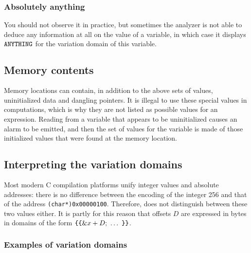 \documentclass{frama-c-book}
\newcommand{\cbopen}{\mbox{\tt \{}}
\newcommand{\cbclose}{\mbox{\tt \}}}
\begin{document}
\subsubsection{Absolutely anything}
You should not observe it in practice, but sometimes the analyzer is
not able to deduce any information at all on the value of a variable,
in which case it displays $\mbox{\tt ANYTHING}$ for the variation
domain of this variable.

\subsection{Memory contents}

Memory locations can contain, in addition to the above sets of values,
uninitialized data and dangling pointers. It is illegal to use these
special values in computations, which is why they are not listed as
possible values for an expression. Reading from a variable that
appears to be uninitialized causes an alarm to be emitted, and
then the set of values for the variable is made of those initialized
values that were found at the memory location.

\subsection{Interpreting the variation domains}

Most modern C compilation platforms unify integer values
and absolute addresses:
there is no difference between the encoding of the integer 256
and that of the address \lstinline|(char*)0x00000100|. Therefore, \Eva{}
does not distinguish between these two values either. It is partly
for this reason that offsets $D$ are expressed
in bytes in domains of the form $\cbopen\cbopen \&x + D;\ \ldots\ \cbclose\cbclose$.

\subsubsection{Examples of variation domains}
\end{document}
